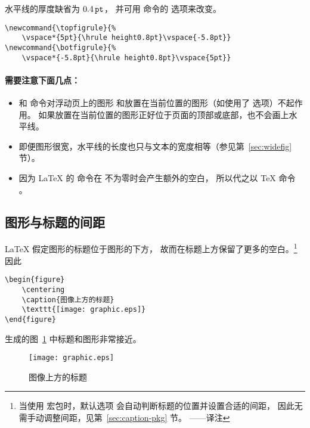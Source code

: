 水平线的厚度缺省为 $0.4\,\mathtt{pt}$，
并可用  命令的  选项来改变。
\begin{lstlisting}
\newcommand{\topfigrule}{% 
	\vspace*{5pt}{\hrule height0.8pt}\vspace{-5.8pt}} 
\newcommand{\botfigrule}{% 
	\vspace*{-5.8pt}{\hrule height0.8pt}\vspace{5pt}}
\end{lstlisting}

\paragraph{需要注意下面几点：}
\begin{itemize}
	\item {} 和  命令对浮动页上的图形
	和放置在当前位置的图形（如使用了 选项）不起作用。
	如果放置在当前位置的图形正好位于页面的顶部或底部，也不会画上水平线。
	\item 即便图形很宽，水平线的长度也只与文本的宽度相等（参见第~\ref{sec:widefig} 节）。
	\item 因为 \LaTeX{} 的  命令在  不为零时会产生额外的空白，
	所以代之以 \TeX{} 命令 。
\end{itemize}


\subsection{图形与标题的间距}\label{ssec:capspace}

\LaTeX{} 假定图形的标题位于图形的下方，
故而在标题上方保留了更多的空白。\footnote{
    当使用  宏包时，默认选项  会自动判断标题的位置并设置合适的间距，
    因此无需手动调整间距，见第~\ref{sec:caption-pkg} 节。 ——译注}
因此
\begin{lstlisting}
\begin{figure} 
	\centering 
	\caption{图像上方的标题} 
	\texttt{[image: graphic.eps]} 
\end{figure}
\end{lstlisting}
生成的图~\ref{fig:verynearcap} 中标题和图形非常接近。

\begin{figure}[ht]
    \captionsetup{position=below}
	\centering 
	\caption{图像上方的标题} \label{fig:verynearcap}
	\texttt{[image: graphic.eps]} 
\end{figure}


